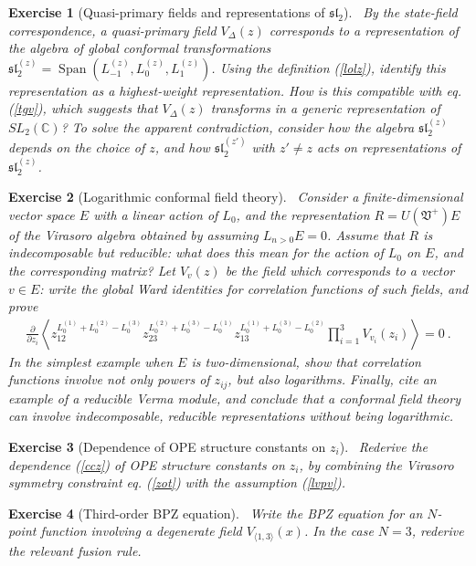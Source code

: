 \documentclass[12pt,a4paper,notitlepage]{report}
\newcommand \C {\mathbb{C}}
\newcommand \p {\partial}
\newcommand \pp[1] {{\frac{\p}{\p #1}}}
\numberwithin{equation}{section}
\theoremstyle{break}
\newtheorem{exo}{Exercise}[chapter]
\begin{document}
\begin{exo}[Quasi-primary fields and representations of $\mathfrak{sl}_2$]
 ~\label{exoqp}
By the state-field correspondence, a quasi-primary field $V_\Delta(z)$ corresponds to a representation of the algebra of global conformal transformations $\mathfrak{sl}_2^{(z)} = \operatorname{Span}(L_{-1}^{(z)},L_0^{(z)},L_1^{(z)})$. Using the definition (\ref{lolz}), identify this representation as a highest-weight representation. How is this compatible with eq. (\ref{tgv}), which suggests that $V_\Delta(z)$ transforms in a generic representation of $SL_2(\C)$? To solve the apparent contradiction, consider how the algebra $\mathfrak{sl}_2^{(z)}$ depends on the choice of $z$, and how $\mathfrak{sl}_2^{(z')}$ with $z'\neq z$ acts on representations of $\mathfrak{sl}_2^{(z)}$.
\end{exo}

\begin{exo}[Logarithmic conformal field theory]
 ~\label{exolog}
Consider a finite-dimensional vector space $E$ with a linear action of $L_0$, and the representation $R=U(\mathfrak{V}^+)E$ of the Virasoro algebra obtained by assuming $L_{n>0}E=0$. Assume that $R$ is indecomposable but reducible: what does this mean for the action of $L_0$ on $E$, and the corresponding matrix? Let $V_v(z)$ be the field which corresponds to a vector $v\in E$: write the global Ward identities for correlation functions of such fields, and prove 
\begin{align}
 \pp{z_i} \left\langle z_{12}^{L_0^{(1)}+L_0^{(2)}-L_0^{(3)}} z_{23}^{L_0^{(2)}+L_0^{(3)}-L_0^{(1)}} z_{13}^{L_0^{(1)}+L_0^{(3)}-L_0^{(2)}} \prod_{i=1}^3 V_{v_i}(z_i)\right\rangle = 0\ .
\end{align}
In the simplest example when $E$ is two-dimensional, show that correlation functions involve not only powers of $z_{ij}$, but also logarithms. Finally, cite an example of a reducible Verma module, and conclude that 
a conformal field theory can involve indecomposable, reducible representations without being logarithmic. 
\end{exo}


\begin{exo}[Dependence of OPE structure constants on $z_i$]
 ~\label{exoopz}
Rederive the dependence (\ref{ccz}) of OPE structure constants on $z_i$, by combining the Virasoro symmetry constraint eq. (\ref{zot}) with the assumption (\ref{lvpv}).  
\end{exo}

\begin{exo}[Third-order BPZ equation]
 ~\label{exotob}
 Write the BPZ equation for an $N$-point function involving a degenerate field $V_{\langle 1,3 \rangle}(x)$. In the case $N=3$, rederive the relevant fusion rule.
\end{exo}
\end{document}
